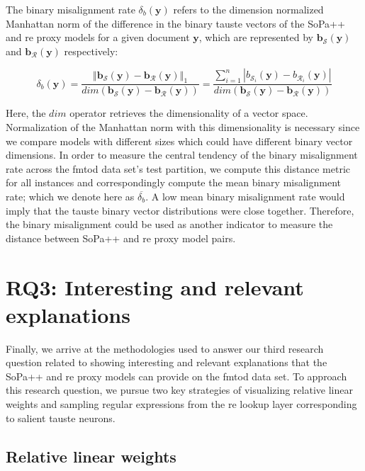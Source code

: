 The binary misalignment rate $\delta_b(\bm{y})$ refers to the dimension
normalized Manhattan norm of the difference in the binary \ac{tauste} vectors of the
SoPa++ and \ac{re} proxy models for a given document $\bm{y}$, which are represented
by $\bm{b_{\mathcal{S}}}(\bm{y})$ and $\bm{b_{\mathcal{R}}}(\bm{y})$
respectively:

\begin{equation}
  \delta_b(\bm{y}) = \dfrac{\left\Vert \bm{b_{\mathcal{S}}}(\bm{y}) - \bm{b_{\mathcal{R}}}(\bm{y}) \right\Vert_{1}}{dim(\bm{b_{\mathcal{S}}}(\bm{y}) - \bm{b_{\mathcal{R}}}(\bm{y}))} = \dfrac{\sum^n_{i=1} |b_{\mathcal{S}_i}(\bm{y}) - b_{\mathcal{R}_i}(\bm{y})|}{{dim(\bm{b_{\mathcal{S}}}(\bm{y}) - \bm{b_{\mathcal{R}}}(\bm{y}))}}
\end{equation}

Here, the $dim$ operator retrieves the dimensionality of a vector space.
Normalization of the Manhattan norm with this dimensionality is necessary since
we compare models with different sizes which could have different binary vector
dimensions. In order to measure the central tendency of the binary misalignment
rate across the \ac{fmtod} data set's test partition, we compute this distance metric
for all instances and correspondingly compute the mean binary misalignment rate;
which we denote here as $\overline{\delta_b}$. A low mean binary misalignment
rate would imply that the \ac{tauste} binary vector distributions were close
together. Therefore, the binary misalignment could be used as another indicator
to measure the distance between SoPa++ and \ac{re} proxy model pairs.

\section{RQ3: Interesting and relevant explanations}

Finally, we arrive at the methodologies used to answer our third research
question related to showing interesting and relevant explanations that the
SoPa++ and \ac{re} proxy models can provide on the \ac{fmtod} data set. To
approach this research question, we pursue two key strategies of visualizing
relative linear weights and sampling regular expressions from the \ac{re} lookup
layer corresponding to salient \ac{tauste} neurons.

\subsection{Relative linear weights}

